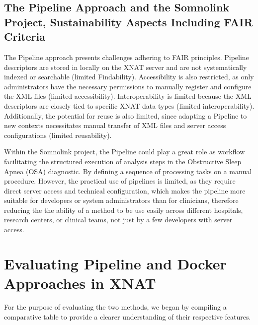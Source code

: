 


\subsection{The Pipeline Approach and the Somnolink Project, Sustainability Aspects Including FAIR Criteria}
The Pipeline approach presents challenges adhering to FAIR principles.
Pipeline descriptors are stored in locally on the XNAT server and are not systematically indexed or searchable (limited Findability).
 Accessibility is also restricted, as only administrators have the necessary permissions to manually register and configure the XML files (limited accessibility).
 Interoperability is limited because the XML descriptors are closely tied to specific XNAT data types (limited interoperability). Additionally, the potential for reuse is also limited, since adapting a Pipeline to new contexts necessitates manual transfer of XML files and server access configurations (limited reusability).
 
Within the Somnolink project, the Pipeline could play a great role as workflow  facilitating the structured execution of analysis steps in the Obstructive Sleep Apnea (OSA) diagnostic. By defining a sequence of processing tasks on a manual procedure. However, the practical use of pipelines is limited, as they require direct server access and technical configuration, which makes the pipeline more suitable for developers or system administrators than for clinicians, therefore reducing the the ability of a method to be use easily across different hospitals, research centers, or clinical teams, not just by a few developers with server access.








\section{Evaluating Pipeline and Docker Approaches in XNAT}

For the purpose of evaluating the two methods, we began by compiling a comparative table to provide a clearer understanding of their respective features.

